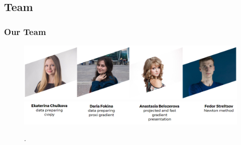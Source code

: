 \documentclass[hyperref={pdfpagelabels=false}]{beamer}
\begin{document}
\subsection{Team}
\begin{frame}
\frametitle{Our Team}

\begin{figure}[h]
\begin{adjustwidth}{-1.1cm}{-0.9 cm}
\includegraphics[scale=0.38]{Team.png}\\
\includegraphics[scale=0.35]{signs.png}
\end{adjustwidth}
\caption{.}
\end{figure}

\end{frame}

\end{document}
